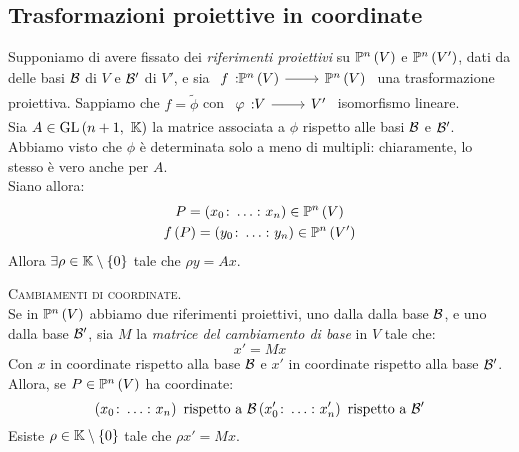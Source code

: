 \subsection{Trasformazioni proiettive in coordinate}
Supponiamo di avere fissato dei \textit{riferimenti proiettivi} su $\proj{V}$ e $\proj{V'}$, dati da delle basi $\mathcal{B}$ di $V$ e $\mathcal{B}'$ di $V'$, e sia $\funz{f}{\proj{V}}{\proj{V}}$ una trasformazione proiettiva. Sappiamo che $f=\tilde{\phi}$ con $\funz{\phi}{V}{V'}$ isomorfismo lineare.\\
Sia $A\in\operatorname{GL}\left(n+1,\ \mathbb{K}\right)$ la matrice associata a $\phi$ rispetto alle basi $\mathcal{B}$ e $\mathcal{B}'$. Abbiamo visto che $\phi$ è determinata solo a meno di multipli: chiaramente, lo stesso è vero anche per $A$.\\
Siano allora:
\begin{gather*}
	P=\left(x_0\colon\ldots\colon x_n\right)\in\proj{V}\\
	f\left(P\right)=\left(y_0\colon\ldots\colon y_n\right)\in\proj{V'}
\end{gather*}
Allora $\exists\rho\in\mathbb{K}\setminus\left\{0\right\}$ tale che $\rho y=Ax$.
\begin{observe}\textsc{Cambiamenti di coordinate.}\\
Se in $\proj{V}$ abbiamo due riferimenti proiettivi, uno dalla dalla base $\mathcal{B}$, e uno dalla base $\mathcal{B}'$, sia $M$ la \textit{matrice del cambiamento di base} in $V$ tale che:
\begin{equation*}
	x'=Mx
\end{equation*}
Con $x$ in coordinate rispetto alla base $\mathcal{B}$ e $x'$ in coordinate rispetto alla base $\mathcal{B}'$. Allora, se $P\in\proj{V}$ ha coordinate:
\begin{equation*}
	\left(x_0\colon\ldots\colon x_n\right)\text{ rispetto a }\mathcal{B}\\
	\left(x_0'\colon\ldots\colon x_n'\right)\text{ rispetto a }\mathcal{B}'
\end{equation*}
Esiste $\rho\in\mathbb{K}\setminus\left\{0\right\}$ tale che $\rho x'=M x$.
\end{observe}
